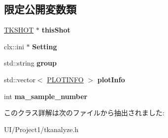 \subsection*{限定公開変数類}
\begin{DoxyCompactItemize}
\item 
\mbox{\label{class_t_k_a_n_a_l_y_z_e_a9413390f419657d838a950ad91198b2d}} 
\hyperlink{class_t_k_s_h_o_t}{T\+K\+S\+H\+OT} $\ast$ {\bfseries this\+Shot}
\item 
\mbox{\label{class_t_k_a_n_a_l_y_z_e_a8ef97d5dda7259043e08c5d80dc321d0}} 
clx\+::ini $\ast$ {\bfseries Setting}
\item 
\mbox{\label{class_t_k_a_n_a_l_y_z_e_affe19e7048a316ab493835883d9d5568}} 
std\+::string {\bfseries group}
\item 
\mbox{\label{class_t_k_a_n_a_l_y_z_e_a15230e395923bdafd1b2ad44a931be02}} 
std\+::vector$<$ \hyperlink{class_t_k_p_l_o_t_1_1_p_l_o_t_i_n_f_o}{P\+L\+O\+T\+I\+N\+FO} $>$ {\bfseries plot\+Info}
\item 
\mbox{\label{class_t_k_a_n_a_l_y_z_e_a7fd597ef5634b9ca6a346e305a0c1c23}} 
int {\bfseries ma\+\_\+sample\+\_\+number}
\end{DoxyCompactItemize}


このクラス詳解は次のファイルから抽出されました\+:\begin{DoxyCompactItemize}
\item 
U\+I/\+Project1/tkanalyze.\+h\end{DoxyCompactItemize}
